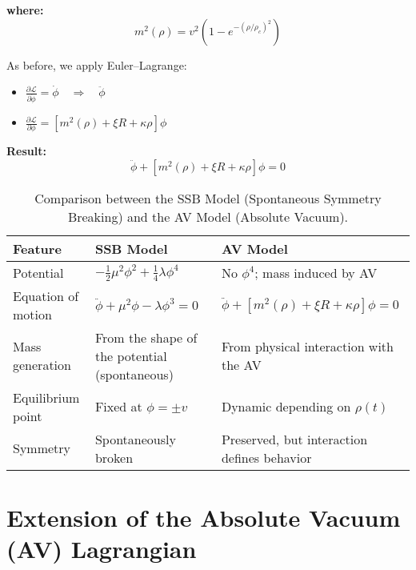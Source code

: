\documentclass[twoside]{article}
\theoremstyle{definition}
\theoremstyle{remark}
\numberwithin{equation}{section}
\theoremstyle{definition}
\theoremstyle{example}
\theoremstyle{remark}
\numberwithin{equation}{section}%
\begin{document}
	\textbf{where:}
	\begin{equation}
		m^2(\rho) = v^2 \left( 1 - e^{-(\rho/\rho_c)^2} \right)
	\end{equation}
	
	As before, we apply Euler–Lagrange:
	
	\begin{itemize}
		\item $\displaystyle \frac{\partial \mathcal{L}}{\partial \dot{\phi}} = \dot{\phi} \quad \Rightarrow \quad \ddot{\phi}$
		\item $\displaystyle \frac{\partial \mathcal{L}}{\partial \phi} = \left[ m^2(\rho) + \xi R + \kappa \rho \right] \phi$
	\end{itemize}
	
	\textbf{Result:}
	\begin{equation}
		\boxed{
			\ddot{\phi} + \left[ m^2(\rho) + \xi R + \kappa \rho \right] \phi = 0
		}
	\end{equation}
	
	\renewcommand{\arraystretch}{1.5}
	\begin{table}[h]
		\centering
		\begin{tabular}{|>{\centering\arraybackslash}m{4.2cm}|m{5.5cm}|m{5.5cm}|}
			\hline
			\textbf{Feature} & \textbf{SSB Model} & \textbf{AV Model} \\
			\hline
			Potential &
			$-\frac{1}{2}\mu^2 \phi^2 + \frac{1}{4} \lambda \phi^4$ &
			No $\phi^4$; mass induced by AV \\
			\hline
			Equation of motion &
			$\ddot{\phi} + \mu^2 \phi - \lambda \phi^3 = 0$ &
			$\ddot{\phi} + [m^2(\rho) + \xi R + \kappa \rho] \phi = 0$ \\
			\hline
			Mass generation &
			From the shape of the potential (spontaneous) &
			From physical interaction with the AV \\
			\hline
			Equilibrium point &
			Fixed at $\phi = \pm v$ &
			Dynamic depending on $\rho(t)$ \\
			\hline
			Symmetry &
			Spontaneously broken &
			Preserved, but interaction defines behavior \\
			\hline
		\end{tabular}
		\caption{Comparison between the SSB Model (Spontaneous Symmetry Breaking) and the AV Model (Absolute Vacuum).}
		\label{tab:models}
	\end{table}
	
	\section{Extension of the Absolute Vacuum (AV) Lagrangian}
	
\end{document}
